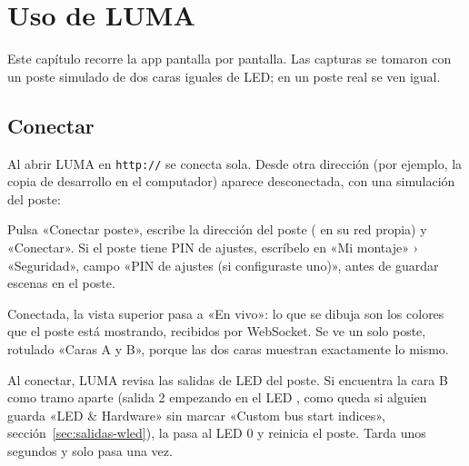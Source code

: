 \chapter{Uso de LUMA}\label{cap:uso}

Este capítulo recorre la app pantalla por pantalla. Las capturas se tomaron con un poste simulado de dos caras iguales de  LED; en un poste real se ven igual.

\section{Conectar}

Al abrir LUMA en \texttt{http://} se conecta sola. Desde otra dirección (por ejemplo, la copia de desarrollo en el computador) aparece desconectada, con una simulación del poste:


Pulsa «Conectar poste», escribe la dirección del poste ( en su red propia) y «Conectar». Si el poste tiene PIN de ajustes, escríbelo en «Mi montaje» › «Seguridad», campo «PIN de ajustes (si configuraste uno)», antes de guardar escenas en el poste.


Conectada, la vista superior pasa a «En vivo»: lo que se dibuja son los colores que el poste está mostrando, recibidos por WebSocket. Se ve un solo poste, rotulado «Caras A y B», porque las dos caras muestran exactamente lo mismo.

Al conectar, LUMA revisa las salidas de LED del poste. Si encuentra la cara B como tramo aparte (salida 2 empezando en el LED , como queda si alguien guarda «LED \& Hardware» sin marcar «Custom bus start indices», sección~\ref{sec:salidas-wled}), la pasa al LED 0 y reinicia el poste. Tarda unos segundos y solo pasa una vez.



